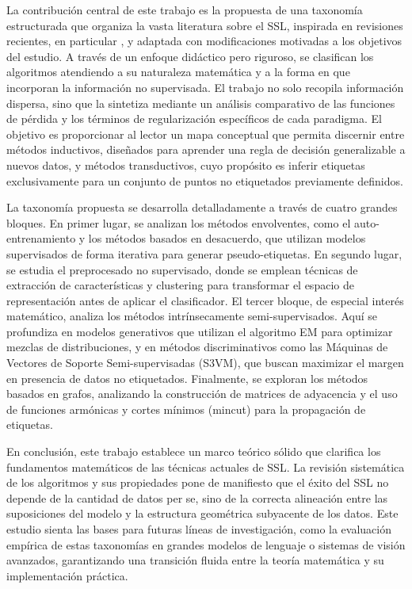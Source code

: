 La contribución central de este trabajo es la propuesta de una taxonomía estructurada que organiza la vasta literatura sobre el \acrshort{SSL}, inspirada en revisiones recientes, en particular \citet{van2020survey}, y adaptada con modificaciones motivadas a los objetivos del estudio. A través de un enfoque didáctico pero riguroso, se clasifican los algoritmos atendiendo a su naturaleza matemática y a la forma en que incorporan la información no supervisada. El trabajo no solo recopila información dispersa, sino que la sintetiza mediante un análisis comparativo de las funciones de pérdida y los términos de regularización específicos de cada paradigma. El objetivo es proporcionar al lector un mapa conceptual que permita discernir entre métodos inductivos, diseñados para aprender una regla de decisión generalizable a nuevos datos, y métodos transductivos, cuyo propósito es inferir etiquetas exclusivamente para un conjunto de puntos no etiquetados previamente definidos.

La taxonomía propuesta se desarrolla detalladamente a través de cuatro grandes bloques. En primer lugar, se analizan los métodos envolventes, como el auto-entrenamiento y los métodos basados en desacuerdo, que utilizan modelos supervisados de forma iterativa para generar pseudo-etiquetas. En segundo lugar, se estudia el preprocesado no supervisado, donde se emplean técnicas de extracción de características y clustering para transformar el espacio de representación antes de aplicar el clasificador. El tercer bloque, de especial interés matemático, analiza los métodos intrínsecamente semi-supervisados. Aquí se profundiza en modelos generativos que utilizan el algoritmo EM para optimizar mezclas de distribuciones, y en métodos discriminativos como las Máquinas de Vectores de Soporte Semi-supervisadas (S3VM), que buscan maximizar el margen en presencia de datos no etiquetados. Finalmente, se exploran los métodos basados en grafos, analizando la construcción de matrices de adyacencia y el uso de funciones armónicas y cortes mínimos (mincut) para la propagación de etiquetas.

En conclusión, este trabajo establece un marco teórico sólido que clarifica los fundamentos matemáticos de las técnicas actuales de \acrshort{SSL}. La revisión sistemática de los algoritmos y sus propiedades pone de manifiesto que el éxito del \acrshort{SSL} no depende de la cantidad de datos per se, sino de la correcta alineación entre las suposiciones del modelo y la estructura geométrica subyacente de los datos. Este estudio sienta las bases para futuras líneas de investigación, como la evaluación empírica de estas taxonomías en grandes modelos de lenguaje o sistemas de visión avanzados, garantizando una transición fluida entre la teoría matemática y su implementación práctica.
